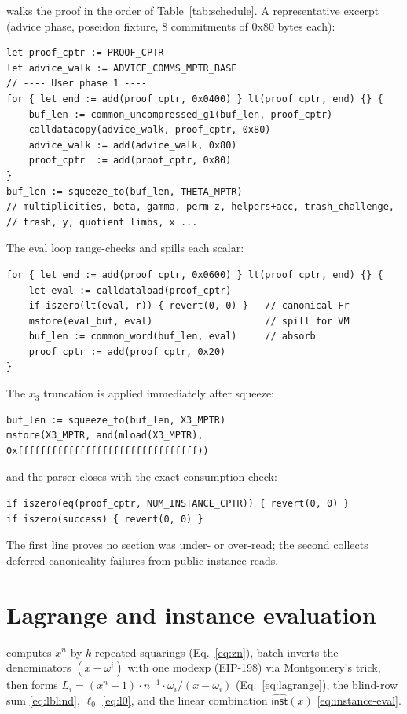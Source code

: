  walks the proof in the order of
Table~\ref{tab:schedule}. A representative excerpt (advice phase, poseidon
fixture, 8 commitments of 0x80 bytes each):
\begin{lstlisting}[style=yul]
let proof_cptr := PROOF_CPTR
let advice_walk := ADVICE_COMMS_MPTR_BASE
// ---- User phase 1 ----
for { let end := add(proof_cptr, 0x0400) } lt(proof_cptr, end) {} {
    buf_len := common_uncompressed_g1(buf_len, proof_cptr)
    calldatacopy(advice_walk, proof_cptr, 0x80)
    advice_walk := add(advice_walk, 0x80)
    proof_cptr  := add(proof_cptr, 0x80)
}
buf_len := squeeze_to(buf_len, THETA_MPTR)
// multiplicities, beta, gamma, perm z, helpers+acc, trash_challenge,
// trash, y, quotient limbs, x ...
\end{lstlisting}
The eval loop range-checks and spills each scalar:
\begin{lstlisting}[style=yul]
for { let end := add(proof_cptr, 0x0600) } lt(proof_cptr, end) {} {
    let eval := calldataload(proof_cptr)
    if iszero(lt(eval, r)) { revert(0, 0) }   // canonical Fr
    mstore(eval_buf, eval)                    // spill for VM
    buf_len := common_word(buf_len, eval)     // absorb
    proof_cptr := add(proof_cptr, 0x20)
}
\end{lstlisting}
The $x_3$ truncation is applied immediately after squeeze:
\begin{lstlisting}[style=yul]
buf_len := squeeze_to(buf_len, X3_MPTR)
mstore(X3_MPTR, and(mload(X3_MPTR), 0xffffffffffffffffffffffffffffffff))
\end{lstlisting}
and the parser closes with the exact-consumption check:
\begin{lstlisting}[style=yul]
if iszero(eq(proof_cptr, NUM_INSTANCE_CPTR)) { revert(0, 0) }
if iszero(success) { revert(0, 0) }
\end{lstlisting}
The first line proves no section was under- or over-read; the second
collects deferred canonicality failures from public-instance reads.

\section{Lagrange and instance evaluation}
\label{sec:sol-lagrange}

 computes $x^n$ by $k$ repeated squarings
(Eq.~\eqref{eq:zn}), batch-inverts the denominators $(x-\omega^i)$ with
one modexp (EIP-198) via Montgomery's trick, then forms
$L_i = (x^n-1)\cdot n^{-1}\cdot \omega_i / (x-\omega_i)$
(Eq.~\eqref{eq:lagrange}), the blind-row sum \eqref{eq:lblind},
$\ell_0$ \eqref{eq:l0}, and the linear combination
$\widehat{\mathsf{inst}}(x)$ \eqref{eq:instance-eval}.

